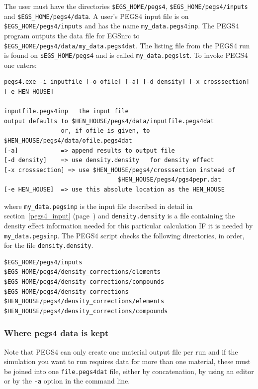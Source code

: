 The user must have the directories {\tt \$EGS\_HOME/pegs4}, 
{\tt \$EGS\_HOME/pegs4/inputs} and {\tt \$EGS\_HOME/pegs4/data}.
A user's PEGS4 input file is on {\tt \$EGS\_HOME/pegs4/inputs} 
and has the name \verb+my_data.pegs4inp+.  The PEGS4 program outputs the
data file for EGSnrc to
\verb+$EGS_HOME/pegs4/data/my_data.pegs4dat+.
The listing file from the PEGS4
run is found on \verb+$EGS_HOME/pegs4+ and is called \verb+my_data.pegslst+.
To invoke PEGS4 one enters:
\begin{verbatim}
pegs4.exe -i inputfile [-o ofile] [-a] [-d density] [-x crosssection] [-e HEN_HOUSE]

inputfile.pegs4inp   the input file
output defaults to $HEN_HOUSE/pegs4/data/inputfile.pegs4dat
                or, if ofile is given, to $HEN_HOUSE/pegs4/data/ofile.pegs4dat
[-a]            => append results to output file
[-d density]    => use density.density   for density effect
[-x crosssection] => use $HEN_HOUSE/pegs4/crosssection instead of
                                $HEN_HOUSE/pegs4/pgs4pepr.dat
[-e HEN_HOUSE]  => use this absolute location as the HEN_HOUSE
\end{verbatim}
where \verb+my_data.pegsinp+ is the input file described in detail in
section~\ref{pegs4_input} (page~\pageref{pegs4_input}) and 
\verb+density.density+
is a file containing the density effect information needed for this
particular calculation IF it is needed by \verb+my_data.pegsinp+.
The PEGS4 script checks the following directories, in order, for
the file \verb+density.density+.
\begin{verbatim}
$EGS_HOME/pegs4/inputs
$EGS_HOME/pegs4/density_corrections/elements
$EGS_HOME/pegs4/density_corrections/compounds
$EGS_HOME/pegs4/density_corrections
$HEN_HOUSE/pegs4/density_corrections/elements
$HEN_HOUSE/pegs4/density_corrections/compounds
\end{verbatim}

\subsubsection{Where pegs4 data is kept}
\label{wpdk}

Note that PEGS4 can only create one material output file per run and
if the simulation you want to run requires data for more than one material,
these must be joined into one \verb+file.pegs4dat+ file, either by 
concatenation, by using an editor or by the {\tt -a} option in the command
line.

